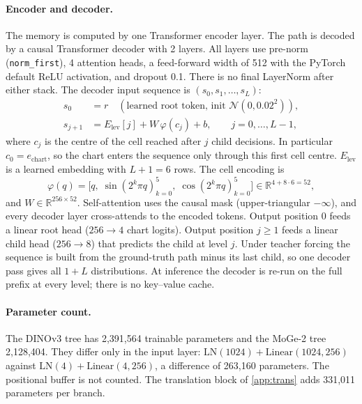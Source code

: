 \paragraph{Encoder and decoder.}
The memory is computed by one Transformer encoder layer. The path is decoded by a causal Transformer decoder with 2 layers. All layers use pre-norm (\texttt{norm\_first}), 4 attention heads, a feed-forward width of 512 with the PyTorch default ReLU activation, and dropout 0.1. There is no final LayerNorm after either stack. The decoder input sequence is $(s_0,s_1,\dots,s_{L})$:
\begin{align}
  s_0&=r \quad(\text{learned root token, init } \mathcal{N}(0,0.02^2)),\\
  s_{j+1}&=E_{\text{lev}}[j]+W\,\varphi(c_j)+b,\qquad j=0,\dots,L-1,
\end{align}
where $c_j$ is the centre of the cell reached after $j$ child decisions. In particular $c_0=e_{\text{chart}}$, so the chart enters the sequence only through this first cell centre. $E_{\text{lev}}$ is a learned embedding with $L+1=6$ rows. The cell encoding is
\begin{equation}
  \varphi(q)=\big[q,\;\sin(2^k\pi q)_{k=0}^{5},\;\cos(2^k\pi q)_{k=0}^{5}\big]\in\mathbb{R}^{4+8\cdot6=52},
\end{equation}
and $W\in\mathbb{R}^{256\times52}$. Self-attention uses the causal mask (upper-triangular $-\infty$), and every decoder layer cross-attends to the encoded tokens. Output position 0 feeds a linear root head ($256\to4$ chart logits). Output position $j\ge1$ feeds a linear child head ($256\to8$) that predicts the child at level $j$. Under teacher forcing the sequence is built from the ground-truth path minus its last child, so one decoder pass gives all $1+L$ distributions. At inference the decoder is re-run on the full prefix at every level; there is no key--value cache.

\paragraph{Parameter count.}
The DINOv3 tree has 2,391,564 trainable parameters and the MoGe-2 tree 2,128,404. They differ only in the input layer: $\mathrm{LN}(1024)+\mathrm{Linear}(1024,256)$ against $\mathrm{LN}(4)+\mathrm{Linear}(4,256)$, a difference of 263,160 parameters. The positional buffer is not counted. The translation block of \cref{app:trans} adds 331,011 parameters per branch.

